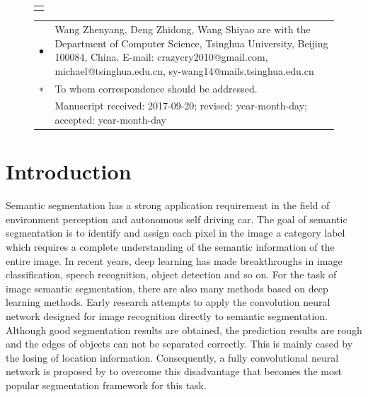 \documentclass[10.5pt,compsoc]{TsT}
\newcommand{\upcite}[1]{\superscript{\textsuperscript{\cite{#1}}}}
\theoremstyle{mystyle}
\newcommand{\upcite}[1]{\textsuperscript{\cite{#1}}}
\begin{document}
{\begin{strip}
{\begin{tabular}{p{160mm}}
\end{tabular}
}
\vskip 6mm

\vskip -3mm
\end{strip}


\thispagestyle{plain}%
\thispagestyle{empty}%
\makeatother
\pagestyle{tstheadings}

\begin{figure}[b]
\vskip -6mm
\begin{tabular}{p{44mm}}
\toprule\\
\end{tabular}
\vskip -4.5mm
\noindent
\setlength{\tabcolsep}{1pt}
\begin{tabular}{p{1.5mm}p{79.5mm}}
$\bullet$& Wang Zhenyang, Deng Zhidong, Wang Shiyao are with the Department of Computer Science, Tsinghua University, Beijing 100084, China. E-mail: crazycry2010@gmail.com, michael@tsinghua.edu.cn, sy-wang14@mails.tsinghua.edu.cn \\
$\sf{*}$&
To whom correspondence should be addressed. \\
          &          Manuscript received: 2017-09-20; revised: year-month-day; accepted: year-month-day

\end{tabular}
\end{figure}



\section{Introduction}
\label{s:introduction}
\noindent

Semantic segmentation has a strong application requirement in the field of environment perception and autonomous self driving car. The goal of semantic segmentation is to identify and assign each pixel in the image a category label which requires a complete understanding of the semantic information of the entire image. In recent years, deep learning has made breakthroughs in image classification\upcite{1,2,3}, speech recognition\upcite{4}, object detection\upcite{5} and so on. For the task of image semantic segmentation, there are also many methods based on deep learning methods. Early research attempts to apply the convolution neural network designed for image recognition directly to semantic segmentation. Although good segmentation results are obtained, the prediction results are rough and the edges of objects  can not be separated correctly. This is mainly cased by the losing of location information. Consequently, a fully convolutional neural network is proposed by to overcome this disadvantage that becomes the most popular segmentation framework for this task.

}
\end{document}
